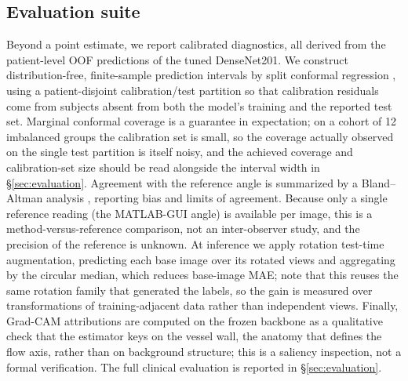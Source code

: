 \subsection{Evaluation suite}
\label{sec:methods:eval}

Beyond a point estimate, we report calibrated diagnostics, all derived from the patient-level OOF predictions of the tuned DenseNet201. We construct distribution-free, finite-sample prediction intervals by split conformal regression \citep{Vovk2005,Lei2018}, using a patient-disjoint calibration/test partition so that calibration residuals come from subjects absent from both the model's training and the reported test set. Marginal conformal coverage is a guarantee in expectation; on a cohort of \num{12} imbalanced groups the calibration set is small, so the coverage actually observed on the single test partition is itself noisy, and the achieved coverage and calibration-set size should be read alongside the interval width in \S\ref{sec:evaluation}. Agreement with the reference angle is summarized by a Bland--Altman analysis \citep{BlandAltman1986}, reporting bias and limits of agreement. Because only a single reference reading (the MATLAB-GUI angle) is available per image, this is a method-versus-reference comparison, not an inter-observer study, and the precision of the reference is unknown. At inference we apply rotation test-time augmentation, predicting each base image over its rotated views and aggregating by the circular median, which reduces base-image MAE; note that this reuses the same rotation family that generated the labels, so the gain is measured over transformations of training-adjacent data rather than independent views. Finally, Grad-CAM \citep{Selvaraju2017} attributions are computed on the frozen backbone as a qualitative check that the estimator keys on the vessel wall, the anatomy that defines the flow axis, rather than on background structure; this is a saliency inspection, not a formal verification. The full clinical evaluation is reported in \S\ref{sec:evaluation}.
